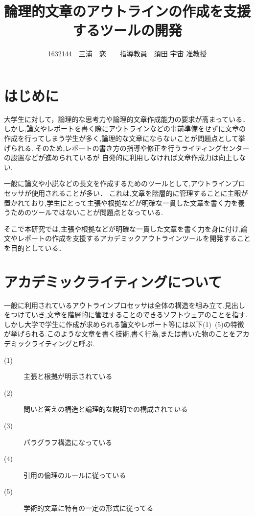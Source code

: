 \documentclass[twocolumn,10pt,a4j]{jsarticle}
\title{論理的文章のアウトラインの作成を支援するツールの開発}
\author{1632144　三浦　恋　　指導教員　須田 宇宙 准教授}
\date{}
\begin{document}
\maketitle

\section{はじめに}

大学生に対して，論理的な思考力や論理的文章作成能力の要求が高まっている．
しかし,論文やレポートを書く際にアウトラインなどの事前準備をせずに文章の作成を行ってしまう学生が多く,論理的な文章にならないことが問題点として挙げられる.
そのため,レポートの書き方の指導や修正を行うライティングセンターの設置などが進められているが
自発的に利用しなければ文章作成力は向上しない.

一般に論文や小説などの長文を作成するためのツールとして,アウトラインプロセッサが使用されることが多い．
これは,文章を階層的に管理することに主眼が置かれており,学生にとって主張や根拠などが明確な一貫した文章を書く力を養うためのツールではないことが問題点となっている.

そこで本研究では,主張や根拠などが明確な一貫した文章を書く力を身に付け,論文やレポートの作成を支援するアカデミックアウトラインツールを開発することを目的としている．

\section{アカデミックライティングについて}
一般に利用されているアウトラインプロセッサは全体の構造を組み立て,見出しをつけていき,文章を階層的に管理することのできるソフトウェアのことを指す.
しかし大学で学生に作成が求められる論文やレポート等には以下(1)~(5)の特徴が挙げられる.このような文章を書く技術,書く行為,または書いた物のことをアカデミックライティングと呼ぶ\cite{ren01}.

\begin{description}
  \item[(1)] 主張と根拠が明示されている
  \item[(2)] 問いと答えの構造と論理的な説明での構成されている
  \item[(3)] パラグラフ構造になっている
  \item[(4)] 引用の倫理のルールに従っている
  \item[(5)] 学術的文章に特有の一定の形式に従ってる
\end{description}
\end{document}
